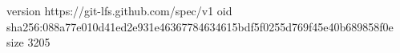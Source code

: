 version https://git-lfs.github.com/spec/v1
oid sha256:088a77e010d41ed2e931e46367784634615bdf5f0255d769f45e40b689858f0e
size 3205
